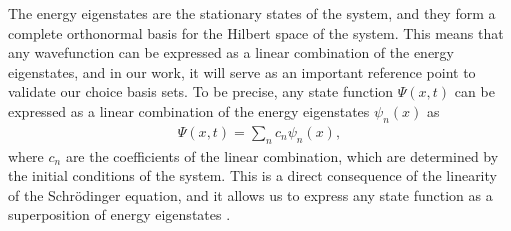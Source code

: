 \documentclass{subfiles}
\begin{document}
The energy eigenstates are the stationary states of the system, and they form a complete orthonormal basis for the Hilbert space of the system. This means that any wavefunction can be expressed as a linear combination of the energy eigenstates, and in our work, it will serve as an important reference point to validate our choice basis sets. To be precise, any state function $\Psi(x, t)$ can be expressed as a linear combination of the energy eigenstates $\psi_n(x)$ as
\begin{align*}
    \Psi(x, t) = \sum_n c_n\psi_n(x),
\end{align*}
where $c_n$ are the coefficients of the linear combination, which are determined by the initial conditions of the system. This is a direct consequence of the linearity of the Schrödinger equation, and it allows us to express any state function as a superposition of energy eigenstates \cite{griffiths2018introduction, berera2021quantum}.
\end{document}

